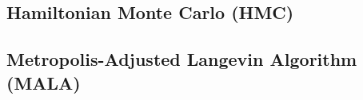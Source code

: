 \subsection{Hamiltonian Monte Carlo (HMC)}

\subsection{Metropolis-Adjusted Langevin Algorithm (MALA)}

%


